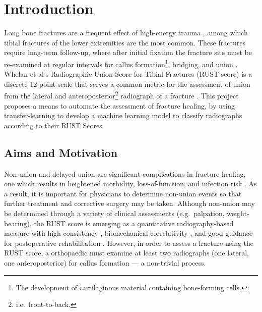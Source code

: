 

\chapter{Introduction}
Long bone fractures are a frequent effect of high-energy trauma \autocite{HStein1999}, among which tibial fractures of the lower extremities are the most common. These fractures require long-term follow-up, where after initial fixation the fracture site must be re-examined at regular intervals for callus formation\footnote{The development of cartilaginous material containing bone-forming cells.}, bridging, and union \autocite{Jones2020}. Whelan et al's Radiographic Union Score for Tibial Fractures (RUST score) is a discrete 12-point scale that serves a common metric for the assessment of union from the lateral and anteroposterior\footnote{i.e.\ front-to-back.} radiograph of a fracture \autocite{Whelan2010}. This project proposes a means to automate the assessment of fracture healing, by using transfer-learning to develop a machine learning model to classify radiographs according to their RUST Scores.

\section{Aims and Motivation}

Non-union and delayed union are significant complications in fracture healing, one which results in heightened morbidity, loss-of-function, and infection risk \autocite{Nicholson2021}. As a result, it is important for physicians to determine non-union events so that further treatment and corrective surgery may be taken. Although non-union may be determined through a variety of clinical assessments (e.g.\ palpation, weight-bearing), the RUST score is emerging as a quantitative radiography-based measure with high consistency \autocite{Panchoo2022}, biomechanical correlativity \autocite{Cook2018}, and good guidance for postoperative rehabilitation \autocite{Debuka2019}. However, in order to assess a fracture using the RUST score, a orthopaedic must examine at least two radiographs (one lateral, one anteroposterior) for callus formation --- a non-trivial process.

